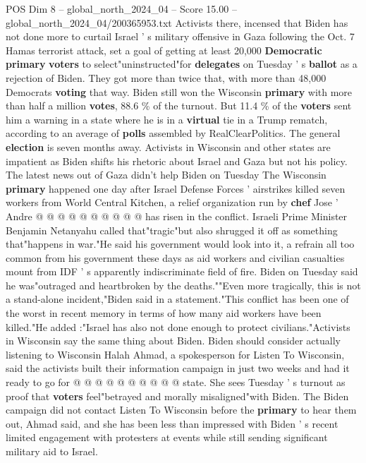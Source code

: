 \begin{textsample}{POS Dim 8 – global\_north\_2024\_04 – Score 15.00 – global\_north\_2024\_04/200365953.txt}  \label{ex:f8_pos_051}
Activists there, incensed that Biden has not done more to curtail Israel ' s military offensive in Gaza following the Oct. 7 Hamas terrorist attack, set a goal of getting at least 20,000 \textbf{Democratic} \textbf{primary} \textbf{voters} to select"uninstructed"for \textbf{delegates} on Tuesday ' s \textbf{ballot} as a rejection of Biden.
They got more than twice that, with more than 48,000 Democrats \textbf{voting} that way.
Biden still won the Wisconsin \textbf{primary} with more than half a million \textbf{votes}, 88.6 \% of the turnout.
But 11.4 \% of the \textbf{voters} sent him a warning in a state where he is in a \textbf{virtual} tie in a Trump rematch, according to an average of \textbf{polls} assembled by RealClearPolitics.
The general \textbf{election} is seven months away.
Activists in Wisconsin and other states are impatient as Biden shifts his rhetoric about Israel and Gaza but not his policy.
The latest news out of Gaza didn't help Biden on Tuesday The Wisconsin \textbf{primary} happened one day after Israel Defense Forces ' airstrikes killed seven workers from World Central Kitchen, a relief organization run by \textbf{chef} Jose ' Andre @ @ @ @ @ @ @ @ @ @ has risen in the conflict.
Israeli Prime Minister Benjamin Netanyahu called that"tragic"but also shrugged it off as something that"happens in war."He said his government would look into it, a refrain all too common from his government these days as aid workers and civilian casualties mount from IDF ' s apparently indiscriminate field of fire.
Biden on Tuesday said he was"outraged and heartbroken by the deaths.""Even more tragically, this is not a stand-alone incident,"Biden said in a statement."This conflict has been one of the worst in recent memory in terms of how many aid workers have been killed."He added :"Israel has also not done enough to protect civilians."Activists in Wisconsin say the same thing about Biden.
Biden should consider actually listening to Wisconsin Halah Ahmad, a spokesperson for Listen To Wisconsin, said the activists built their information campaign in just two weeks and had it ready to go for @ @ @ @ @ @ @ @ @ @ state.
She sees Tuesday ' s turnout as proof that \textbf{voters} feel"betrayed and morally misaligned"with Biden.
The Biden campaign did not contact Listen To Wisconsin before the \textbf{primary} to hear them out, Ahmad said, and she has been less than impressed with Biden ' s recent limited engagement with protesters at events while still sending significant military aid to Israel.

\end{textsample}
